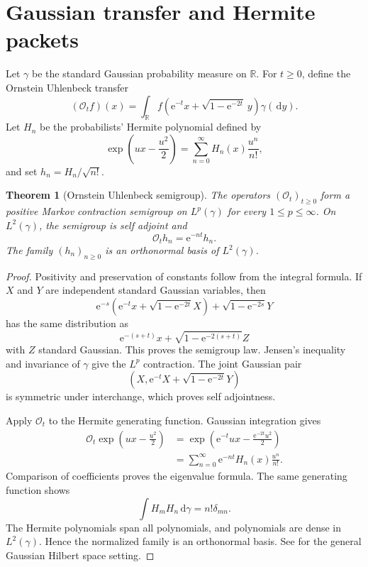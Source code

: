 \documentclass{aomart}
\newtheorem{theorem}{Theorem}[section]
\theoremstyle{definition}
\theoremstyle{remark}
\newcommand{\RR}{\mathbb R}
\newcommand{\Ocal}{\mathcal O}
\newcommand{\e}{\mathrm e}
\newcommand{\dd}{\,\mathrm d}
\begin{document}
\section{Gaussian transfer and Hermite packets}\label{sec:ou_hermite}

Let \(\gamma\) be the standard Gaussian probability measure on \(\RR\). For \(t\geq0\), define the Ornstein Uhlenbeck transfer
\[
(\Ocal_t f)(x)
=
\int_\RR
f\left(
\e^{-t}x+\sqrt{1-\e^{-2t}}\,y
\right)
\gamma(\dd y).
\]
Let \(H_n\) be the probabilists' Hermite polynomial defined by
\[
\exp\left(ux-\frac{u^2}{2}\right)
=
\sum_{n=0}^\infty H_n(x)\frac{u^n}{n!},
\]
and set \(h_n=H_n/\sqrt{n!}\).

\begin{theorem}[Ornstein Uhlenbeck semigroup]\label{thm:ou_semigroup}
The operators \((\Ocal_t)_{t\geq0}\) form a positive Markov contraction semigroup on \(L^p(\gamma)\) for every \(1\leq p\leq\infty\). On \(L^2(\gamma)\), the semigroup is self adjoint and
\[
\Ocal_t h_n=\e^{-nt}h_n.
\]
The family \((h_n)_{n\geq0}\) is an orthonormal basis of \(L^2(\gamma)\).
\end{theorem}

\begin{proof}
Positivity and preservation of constants follow from the integral formula. If \(X\) and \(Y\) are independent standard Gaussian variables, then
\[
\e^{-s}
\left(
\e^{-t}x+\sqrt{1-\e^{-2t}}X
\right)
+
\sqrt{1-\e^{-2s}}Y
\]
has the same distribution as
\[
\e^{-(s+t)}x
+
\sqrt{1-\e^{-2(s+t)}}Z
\]
with \(Z\) standard Gaussian. This proves the semigroup law. Jensen's inequality and invariance of \(\gamma\) give the \(L^p\) contraction. The joint Gaussian pair
\[
\left(
X,
\e^{-t}X+\sqrt{1-\e^{-2t}}Y
\right)
\]
is symmetric under interchange, which proves self adjointness.

Apply \(\Ocal_t\) to the Hermite generating function. Gaussian integration gives
\[
\begin{aligned}
\Ocal_t
\exp\left(ux-\frac{u^2}{2}\right)
&=
\exp\left(
\e^{-t}ux-
\frac{\e^{-2t}u^2}{2}
\right)\\
&=
\sum_{n=0}^\infty
\e^{-nt}H_n(x)\frac{u^n}{n!}.
\end{aligned}
\]
Comparison of coefficients proves the eigenvalue formula. The same generating function shows
\[
\int H_mH_n\dd\gamma=n!\delta_{mn}.
\]
The Hermite polynomials span all polynomials, and polynomials are dense in \(L^2(\gamma)\). Hence the normalized family is an orthonormal basis. See \cite{Janson1997} for the general Gaussian Hilbert space setting.
\end{proof}
\end{document}
